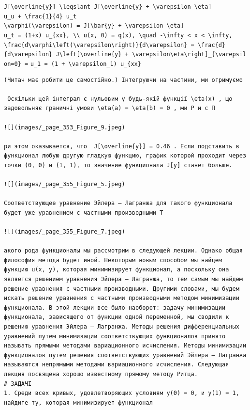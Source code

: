 \documentclass[
  ukrainian,
]{article}
\begin{document}
\texttt{J{[}\textbackslash{}overline\{y\}{]}\ \textbackslash{}leqslant\ J{[}\textbackslash{}overline\{y\}\ +\ \textbackslash{}varepsilon\ \textbackslash{}eta{]}}
\texttt{u\_u\ +\ \textbackslash{}frac\{1\}\{4\}\ u\_t}
\texttt{\textbackslash{}varphi(\textbackslash{}varepsilon)\ =\ J{[}\textbackslash{}bar\{y\}\ +\ \textbackslash{}varepsilon\ \textbackslash{}eta{]}}
\texttt{u\_t\ =\ (1+x)\ u\_\{xx\},\ \textbackslash{}\textbackslash{}\ u(x,\ 0)\ =\ q(x),\ \textbackslash{}quad\ -\textbackslash{}infty\ \textless{}\ x\ \textless{}\ \textbackslash{}infty,}
\texttt{\textbackslash{}frac\{d\textbackslash{}varphi\textbackslash{}left(\textbackslash{}varepsilon\textbackslash{}right)\}\{d\textbackslash{}varepsilon\}\ =\ \textbackslash{}frac\{d\}\{d\textbackslash{}varepsilon\}\ J\textbackslash{}left{[}\textbackslash{}overline\{y\}\ +\ \textbackslash{}varepsilon\textbackslash{}eta\textbackslash{}right{]}\textbar{}\_\{\textbackslash{}varepsilon=0\}\ =}
\texttt{u\_1\ =\ (1\ +\ \textbackslash{}varepsilon\_1)\ u\_\{xx\}}

\begin{verbatim}
(Читач має робити це самостійно.) Інтегруючи на частини, ми отримуємо

 Оскільки цей інтеграл є нульовим у будь-якій функції \eta(x) , що задовольняє граничні умови \eta(a) = \eta(b) = 0 , ми Р и с П

![](images/_page_353_Figure_9.jpeg)

ри этом оказывается, что  J[\overline{y}] = 0.46 . Если подставить в функционал любую другую гладкую функцию, график которой проходит через точки (0, 0) и (1, 1), то значение функционала J[y] станет больше.

![](images/_page_355_Figure_5.jpeg)

Соответствующее уравнение Эйлера — Лагранжа для такого функционала будет уже уравнением с частными производными Т

![](images/_page_355_Figure_7.jpeg)

акого рода функционалы мы рассмотрим в следующей лекции. Однако общая философия метода будет иной. Некоторым новым способом мы найдем функцию u(x, y), которая минимизирует функционал, а поскольку она является решением уравнения Эйлера — Лагранжа, то тем самым мы найдем решение уравнения с частными производными. Другими словами, мы будем искать решение уравнения с частными производными методом минимизации функционала. В этой лекции все было наоборот: задачу минимизации функционала, зависящего от функции одной переменной, мы сводили к решению уравнения Эйлера — Лагранжа. Методы решения дифференциальных уравнений путем минимизации соответствующих функционалов принято называть прямыми методами вариационного исчисления. Методы минимизации функционалов путем решения соответствующих уравнений Эйлера — Лагранжа называются непрямыми методами вариационного исчисления. Следующая лекция посвящена хорошо известному прямому методу Ритца.
# ЗАДАЧІ
1. Среди всех кривых, удовлетворяющих условиям y(0) = 0, и y(1) = 1, найдите ту, которая минимизирует функционал
\end{verbatim}
\end{document}
